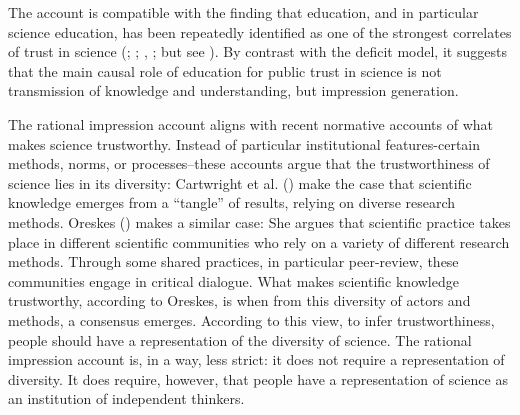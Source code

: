 \documentclass[
  jou,
  floatsintext,
  longtable,
  nolmodern,
  notxfonts,
  notimes,
  colorlinks=true,linkcolor=blue,citecolor=blue,urlcolor=blue]{apa7}
\begin{document}
The account is compatible with the finding that education, and in
particular science education, has been repeatedly identified as one of
the strongest correlates of trust in science
(;
;
,
; but
see ). By contrast with the deficit model, it suggests that the main
causal role of education for public trust in science is not transmission
of knowledge and understanding, but impression generation.

The rational impression account aligns with recent normative accounts of
what makes science trustworthy. Instead of particular institutional
features-certain methods, norms, or processes--these accounts argue that
the trustworthiness of science lies in its diversity: Cartwright et al.
() make the
case that scientific knowledge emerges from a ``tangle'' of results,
relying on diverse research methods. Oreskes
() makes a similar case:
She argues that scientific practice takes place in different scientific
communities who rely on a variety of different research methods. Through
some shared practices, in particular peer-review, these communities
engage in critical dialogue. What makes scientific knowledge
trustworthy, according to Oreskes, is when from this diversity of actors
and methods, a consensus emerges. According to this view, to infer
trustworthiness, people should have a representation of the diversity of
science. The rational impression account is, in a way, less strict: it
does not require a representation of diversity. It does require,
however, that people have a representation of science as an institution
of independent thinkers.
\end{document}
